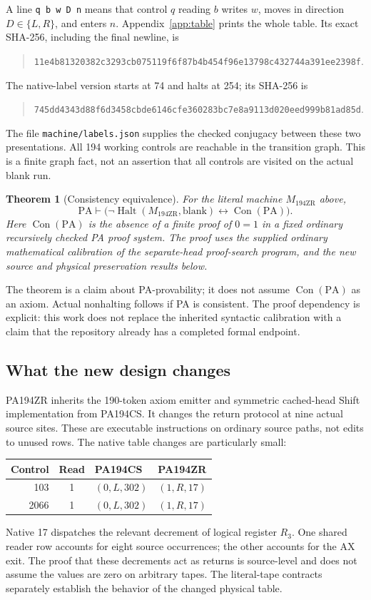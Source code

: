 \documentclass[11pt,letterpaper]{article}
\newcommand{\PA}{\mathrm{PA}}
\newcommand{\Con}{\operatorname{Con}}
\newcommand{\Halt}{\operatorname{Halt}}
\newcommand{\file}[1]{\texttt{\nolinkurl{#1}}}
\newcommand{\M}{M_{\mathrm{194ZR}}}
\newtheorem{theorem}{Theorem}[section]
\begin{document}
A line \texttt{q b w D n} means that control $q$ reading $b$ writes $w$,
moves in direction $D\in\{L,R\}$, and enters $n$. Appendix~\ref{app:table}
prints the whole table. Its exact SHA-256, including the final newline, is
\begin{quote}\small\nolinkurl{11e4b81320382c3293cb075119f6f87b4b454f96e13798c432744a391ee2398f}.\end{quote}
The native-label version starts at 74 and halts at 254; its SHA-256 is
\begin{quote}\small\nolinkurl{745dd4343d88f6d3458cbde6146cfe360283bc7e8a9113d020eed999b81ad85d}.\end{quote}
The file \file{machine/labels.json} supplies the checked conjugacy between
these two presentations. All 194 working controls are reachable in the
transition graph. This is a finite graph fact, not an assertion that all
controls are visited on the actual blank run.

\begin{theorem}[Consistency equivalence]\label{thm:main}
For the literal machine $\M$ above,
\[
 \PA\vdash\bigl(\neg\Halt(\M,\mathrm{blank})
                    \leftrightarrow\Con(\PA)\bigr).
\]
Here $\Con(\PA)$ is the absence of a finite proof of $0=1$ in a fixed
ordinary recursively checked PA proof system. The proof uses the supplied
ordinary mathematical calibration of the separate-head proof-search
program, and the new source and physical preservation results below.
\end{theorem}
The theorem is a claim about PA-provability; it does not assume
$\Con(\PA)$ as an axiom. Actual nonhalting follows if PA is consistent.
The proof dependency is explicit: this work does not replace the
inherited syntactic calibration with a claim that the repository already
has a completed formal endpoint.

\subsection{What the new design changes}
PA194ZR inherits the 190-token axiom emitter and symmetric cached-head
Shift implementation from PA194CS. It changes the return protocol at
nine actual source sites. These are executable instructions on ordinary
source paths, not edits to unused rows. The native table changes are
particularly small:
\begin{center}
\begin{tabular}{@{}rcll@{}}
\toprule
Control & Read & PA194CS & PA194ZR\\\midrule
103 & 1 & $(0,L,302)$ & $(1,R,17)$\\
2066 & 1 & $(0,L,302)$ & $(1,R,17)$\\\bottomrule
\end{tabular}
\end{center}
Native 17 dispatches the relevant decrement of logical register $R_3$.
One shared reader row accounts for eight source occurrences; the other
accounts for the AX exit. The proof that these decrements act as returns
is source-level and does not assume the values are zero on arbitrary
tapes. The literal-tape contracts separately establish the behavior of
the changed physical table.
\end{document}
